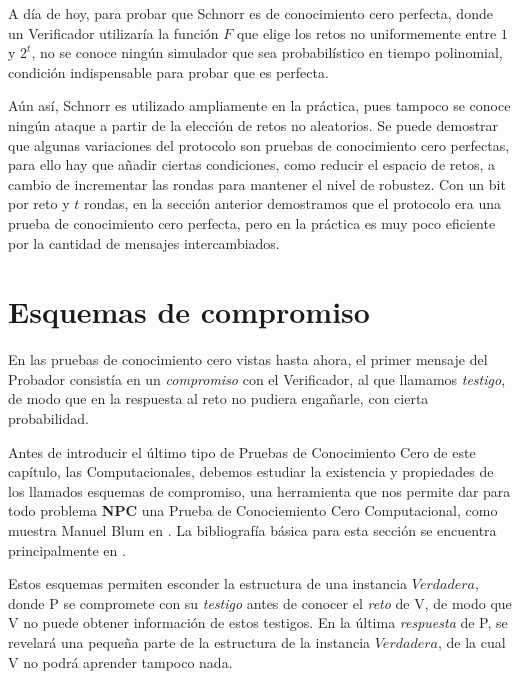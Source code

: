 \hfil

A día de hoy, para probar que Schnorr es de conocimiento cero perfecta, donde un Verificador utilizaría la función $F$ que elige los retos no uniformemente entre $1$ y $2^t$, no se conoce ningún simulador que sea probabilístico en tiempo polinomial, condición indispensable para probar que es perfecta.


Aún así, Schnorr es utilizado ampliamente en la práctica, pues tampoco se conoce ningún ataque a partir de la elección de retos no aleatorios. Se puede demostrar que algunas variaciones del protocolo son pruebas de conocimiento cero perfectas, para ello hay que añadir ciertas condiciones, como reducir el espacio de retos, a cambio de incrementar las rondas para mantener el nivel de robustez. Con un bit por reto y $t$ rondas, en la sección anterior demostramos que el protocolo era una prueba de conocimiento cero perfecta, pero en la práctica es muy poco eficiente por la cantidad de mensajes intercambiados.





\section{Esquemas de compromiso}\label{bitcommitment}

En las pruebas de conocimiento cero vistas hasta ahora, el primer mensaje del Probador consistía en un \textit{compromiso} con el Verificador, al que llamamos \textit{testigo}, de modo que en la respuesta al reto no pudiera engañarle, con cierta probabilidad.


Antes de introducir el último tipo de Pruebas de Conocimiento Cero de este capítulo, las Computacionales, debemos estudiar la existencia y propiedades de los llamados esquemas de compromiso, una herramienta que nos permite dar para todo problema \textbf{NPC} una Prueba de Conociemiento Cero Computacional, como muestra Manuel Blum en  \citep{blum}. La bibliografía básica para esta sección se encuentra principalmente en \citep{pieprzyk2013fundamentals,damgardcommitment}.

Estos esquemas permiten esconder la estructura de una instancia $Verdadera$, donde P se compromete con su \textit{testigo} antes de conocer el \textit{reto} de V, de modo que V no puede obtener información de estos testigos. En la última \textit{respuesta} de P, se revelará una pequeña parte de la estructura de la instancia $Verdadera$, de la cual V no podrá aprender tampoco nada.


